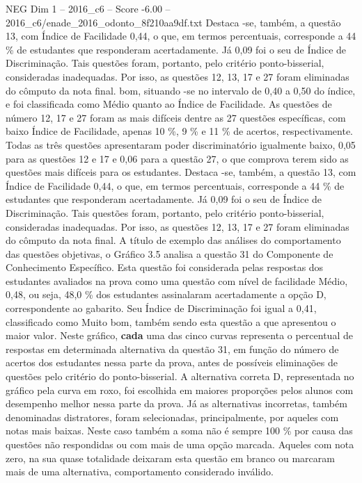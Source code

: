 \begin{textsample}{NEG Dim 1 – 2016\_c6 – Score -6.00 – 2016\_c6/enade\_2016\_odonto\_8f210aa9df.txt}
Destaca -se, também, a questão 13, com Índice de Facilidade 0,44, o que, em termos percentuais, corresponde a 44 \% de estudantes que responderam acertadamente.
Já 0,09 foi o seu de Índice de Discriminação.
Tais questões foram, portanto, pelo critério ponto-bisserial, consideradas inadequadas.
Por isso, as questões 12, 13, 17 e 27 foram eliminadas do cômputo da nota final. bom, situando -se no intervalo de 0,40 a 0,50 do índice, e foi classificada como Médio quanto ao Índice de Facilidade.
As questões de número 12, 17 e 27 foram as mais difíceis dentre as 27 questões específicas, com baixo Índice de Facilidade, apenas 10 \%, 9 \% e 11 \% de acertos, respectivamente.
Todas as três questões apresentaram poder discriminatório igualmente baixo, 0,05 para as questões 12 e 17 e 0,06 para a questão 27, o que comprova terem sido as questões mais difíceis para os estudantes.
Destaca -se, também, a questão 13, com Índice de Facilidade 0,44, o que, em termos percentuais, corresponde a 44 \% de estudantes que responderam acertadamente.
Já 0,09 foi o seu de Índice de Discriminação.
Tais questões foram, portanto, pelo critério ponto-bisserial, consideradas inadequadas.
Por isso, as questões 12, 13, 17 e 27 foram eliminadas do cômputo da nota final.
A título de exemplo das análises do comportamento das questões objetivas, o Gráfico 3.5 analisa a questão 31 do Componente de Conhecimento Específico.
Esta questão foi considerada pelas respostas dos estudantes avaliados na prova como uma questão com nível de facilidade Médio, 0,48, ou seja, 48,0 \% dos estudantes assinalaram acertadamente a opção D, correspondente ao gabarito.
Seu Índice de Discriminação foi igual a 0,41, classificado como Muito bom, também sendo esta questão a que apresentou o maior valor.
Neste gráfico, \textbf{cada} uma das cinco curvas representa o percentual de respostas em determinada alternativa da questão 31, em função do número de acertos dos estudantes nessa parte da prova, antes de possíveis eliminações de questões pelo critério do ponto-bisserial.
A alternativa correta D, representada no gráfico pela curva em roxo, foi escolhida em maiores proporções pelos alunos com desempenho melhor nessa parte da prova.
Já as alternativas incorretas, também denominadas distratores, foram selecionadas, principalmente, por aqueles com notas mais baixas.
Neste caso também a soma não é sempre 100 \% por causa das questões não respondidas ou com mais de uma opção marcada.
Aqueles com nota zero, na sua quase totalidade deixaram esta questão em branco ou marcaram mais de uma alternativa, comportamento considerado inválido.

\end{textsample}
